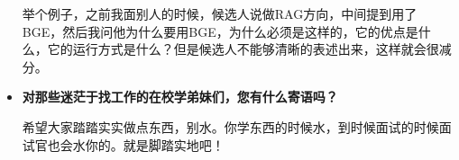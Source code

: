 \begin{itemize}
举个例子，之前我面别人的时候，候选人说做RAG方向，中间提到用了BGE，然后我问他为什么要用BGE，为什么必须是这样的，它的优点是什么，它的运行方式是什么？但是候选人不能够清晰的表述出来，这样就会很减分。

    \item \textbf{对那些迷茫于找工作的在校学弟妹们，您有什么寄语吗？}

    希望大家踏踏实实做点东西，别水。你学东西的时候水，到时候面试的时候面试官也会水你的。就是脚踏实地吧！

\end{itemize}